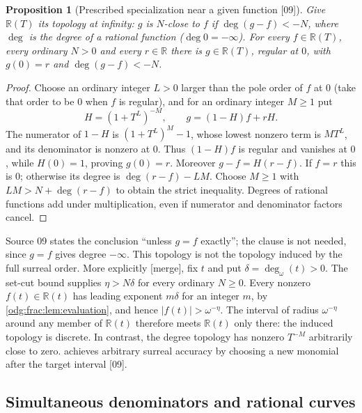 \documentclass[11pt,oneside]{article}
\numberwithin{equation}{section}
\newtheorem{proposition}[proposition]{Proposition}
\theoremstyle{definition}
\theoremstyle{remark}
\newcommand{\R}{\mathbb R}
\newcommand{\ddeg}{\operatorname{deg}_{\omega}}
\newcommand{\src}[1]{\textup{\textsf{\small[#1]}}}
\newcommand{\mergetag}{\textup{\textsf{\small[merge]}}}
\begin{document}
\begin{proposition}[Prescribed specialization near a given function \src{09}]\label{odg:frac:prop:localdense}
Give $\R(T)$ its topology at infinity: $g$ is $N$-close to $f$ if
$\deg(g-f)<-N$, where $\deg$ is the degree of a rational function
($\deg0=-\infty$). For every $f\in\R(T)$, every ordinary $N>0$ and every
$r\in\R$ there is $g\in\R(T)$, regular at $0$, with $g(0)=r$ and
$\deg(g-f)<-N$.
\end{proposition}
\begin{proof}
Choose an ordinary integer $L>0$ larger than the pole order of $f$ at $0$
(take that order to be $0$ when $f$ is regular), and for an ordinary integer
$M\ge1$ put
\[
 H=(1+T^L)^{-M},\qquad g=(1-H)f+rH .
\]
The numerator of $1-H$ is $(1+T^L)^M-1$, whose lowest nonzero term is
$MT^L$, and its denominator is nonzero at $0$. Thus $(1-H)f$ is regular
and vanishes at $0$, while $H(0)=1$, proving $g(0)=r$. Moreover
$g-f=H(r-f)$. If $f=r$ this is $0$; otherwise its degree is
$\deg(r-f)-LM$. Choose $M\ge1$ with $LM>N+\deg(r-f)$ to obtain the
strict inequality. Degrees of rational functions add under multiplication,
even if numerator and denominator factors cancel.
\end{proof}

Source 09 states the conclusion ``unless $g=f$ exactly''; the clause is not
needed, since $g=f$ gives degree $-\infty$. This topology is not the topology
induced by the full surreal order. More explicitly \mergetag, fix $t$ and put
$\delta=\ddeg(t)>0$. The set-cut bound supplies $\eta>N\delta$ for every
ordinary $N\ge0$. Every nonzero $f(t)\in\R(t)$ has leading exponent
$m\delta$ for an integer $m$, by \cref{odg:frac:lem:evaluation}, and hence
$|f(t)|>\omega^{-\eta}$. The interval of radius $\omega^{-\eta}$ around
any member of $\R(t)$ therefore meets $\R(t)$ only there: the induced
topology is discrete. In contrast, the degree topology has nonzero
$T^{-M}$ arbitrarily close to zero.  achieves
arbitrary surreal accuracy by choosing a new monomial after the target
interval \src{09}.

\subsection{Simultaneous denominators and rational curves}\label{odg:frac:sub:curves}
\end{document}
